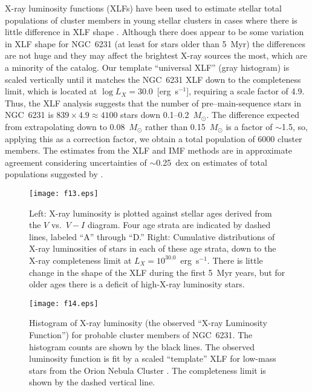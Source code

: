 \documentclass[twocolumn,tighten]{aastex61}
\begin{document}
X-ray luminosity functions (XLFs) have been used to estimate stellar total populations of cluster members in young stellar clusters in cases where there is little difference in XLF shape \citep[e.g.,][and references therein]{2015ApJ...802...60K}. Although there does appear to be some variation in XLF shape for NGC~6231 (at least for stars older than 5~Myr) the differences are not huge and they may affect the brightest X-ray sources the most, which are a minority of the catalog. Our template ``universal XLF'' (gray histogram) is scaled vertically until it matches the NGC~6231 XLF down to the completeness limit, which is located at $\log L_X=30.0$~[erg~s$^{-1}$], requiring a scale factor of 4.9. Thus, the XLF analysis suggests that the number of pre--main-sequence stars in NGC~6231 is $839\times4.9\approx4100$ stars down 0.1--0.2~$M_\odot$. The difference expected from extrapolating down to 0.08~$M_\odot$ rather than 0.15~$M_\odot$ is a factor of $\sim$1.5, so, applying this as a correction factor, we obtain a total population of 6000 cluster members.  The estimates from the XLF and IMF methods are in approximate agreement considering uncertainties of $\sim$0.25~dex on estimates of total populations suggested by \citet{2015ApJ...802...60K}.


\begin{figure*}
\centering
\texttt{[image: f13.eps]} 
\caption{Left: X-ray luminosity is plotted against stellar ages derived from the $V$ vs.\ $V-I$ diagram. Four age strata are indicated by dashed lines, labeled ``A'' through ``D.'' Right: Cumulative distributions of X-ray luminosities of stars in each of these age strata, down to the X-ray completeness limit at $L_X=10^{30.0}$~erg~s$^{-1}$. There is little change in the shape of the XLF during the first 5~Myr years, but for older ages there is a deficit of high-X-ray luminosity stars. 
 \label{optage_lx.fig}}
\end{figure*}

\begin{figure}
\centering
\texttt{[image: f14.eps]} 
\caption{Histogram of X-ray luminosity (the observed ``X-ray Luminosity Function'') for probable cluster members of NGC~6231. The histogram counts are shown by the black lines. The observed luminosity function is fit by a scaled ``template'' XLF for low-mass stars from the Orion Nebula Cluster \citep{2005ApJS..160..379F}. The completeness limit is shown by the dashed vertical line. 
 \label{xlf.fig}}
\end{figure}
\end{document}
